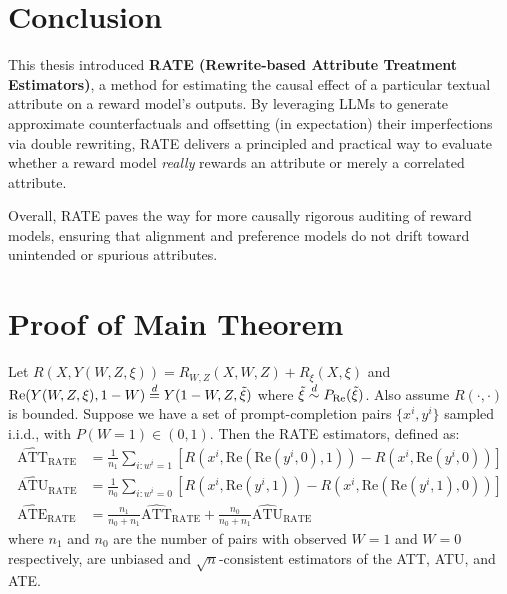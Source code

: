 \section{Conclusion}
\label{sec:conclusion}
This thesis introduced \textbf{RATE (Rewrite-based Attribute Treatment Estimators)}, a method for estimating the causal effect of a particular textual attribute on a reward model’s outputs. By leveraging LLMs to generate approximate counterfactuals and offsetting (in expectation) their imperfections via double rewriting, RATE delivers a principled and practical way to evaluate whether a reward model \emph{really} rewards an attribute or merely a correlated attribute.

Overall, RATE paves the way for more causally rigorous auditing of reward models, ensuring that alignment and preference models do not drift toward unintended or spurious attributes.

\newpage
\appendix
\section{Proof of Main Theorem}
\label{sec:proofs}
\begin{theorem}
\label{thm:unbiased_rate_consistent}
Let $R(X, Y(W,Z,\xi)) = R_{W, Z}(X, W, Z) + R_{\xi}(X, \xi)$ and $\text{Re}(Y(W, Z, \xi), 1 - W) \stackrel{d}{=} Y(1 - W, Z, \tilde{\xi})$ where $\tilde{\xi} \stackrel{d}{\sim} P_\text{Re}(\tilde{\xi})$. Also assume $R(\cdot, \cdot)$ is bounded. Suppose we have a set of prompt-completion pairs $\{x^i, y^{i}\}$ sampled i.i.d., with $P(W=1) \in (0, 1)$.
Then the RATE estimators, defined as:
\begin{align*}
\widehat{\text{ATT}}_{\text{RATE}} &= \frac{1}{n_1} \sum_{i: w^{i} = 1} [R(x^i, \text{Re}(\text{Re}(y^{i}, 0), 1)) - R(x^i, \text{Re}(y^{i}, 0))] \\
\widehat{\text{ATU}}_{\text{RATE}} &= \frac{1}{n_0} \sum_{i: w^{i} = 0} [R(x^i, \text{Re}(y^{i}, 1)) - R(x^i, \text{Re}(\text{Re}(y^{i}, 1), 0))] \\
\widehat{\text{ATE}}_{\text{RATE}} &= \frac{n_1}{n_0 + n_1} \widehat{\text{ATT}}_{\text{RATE}} + \frac{n_0}{n_0 + n_1} \widehat{\text{ATU}}_{\text{RATE}}
\end{align*}
where $n_1$ and $n_0$ are the number of pairs with observed $W = 1$ and $W = 0$ respectively, are unbiased and $\sqrt{n}$-consistent estimators of the ATT, ATU, and ATE.
\end{theorem}

